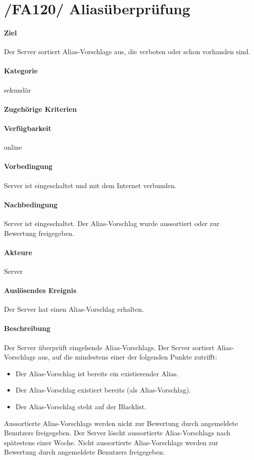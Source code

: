 \section[Aliasüberprüfung]{/FA120/ Aliasüberprüfung}
\label{/FA120/}
\paragraph{Ziel}
Der \Gls{Server} sortiert \Glspl{Alias-Vorschlag} aus, die verboten oder schon vorhanden sind.
\paragraph{Kategorie}
sekundär
\paragraph{Zugehörige Kriterien}

\paragraph{Verfügbarkeit}
online
\paragraph{Vorbedingung}
\Gls{Server} ist eingeschaltet und mit dem Internet verbunden.
\paragraph{Nachbedingung}
\Gls{Server} ist eingeschaltet. Der \Gls{Alias-Vorschlag} wurde aussortiert oder zur Bewertung freigegeben.
\paragraph{Akteure}
\Gls{Server}
\paragraph{Auslösendes Ereignis}
Der \Gls{Server} hat einen \Gls{Alias-Vorschlag} erhalten.
\paragraph{Beschreibung}
Der \Gls{Server} überprüft eingehende \Glspl{Alias-Vorschlag}. Der \Gls{Server} sortiert \Glspl{Alias-Vorschlag} aus, auf die mindestens einer der folgenden Punkte zutrifft:
\begin{itemize}
    \item Der \Gls{Alias-Vorschlag} ist bereits ein existierender \Gls{Alias}.
    \item Der \Gls{Alias-Vorschlag} existiert bereits (als \Gls{Alias-Vorschlag}).
    \item Der \Gls{Alias-Vorschlag} steht auf der \Gls{Blacklist}.
\end{itemize}
Aussortierte \Glspl{Alias-Vorschlag} werden nicht zur Bewertung durch angemeldete \Glspl{Benutzer} freigegeben. Der \Gls{Server} löscht aussortierte \Glspl{Alias-Vorschlag} nach spätestens einer Woche. Nicht aussortierte \Glspl{Alias-Vorschlag} werden zur Bewertung durch angemeldete \Glspl{Benutzer} freigegeben.
